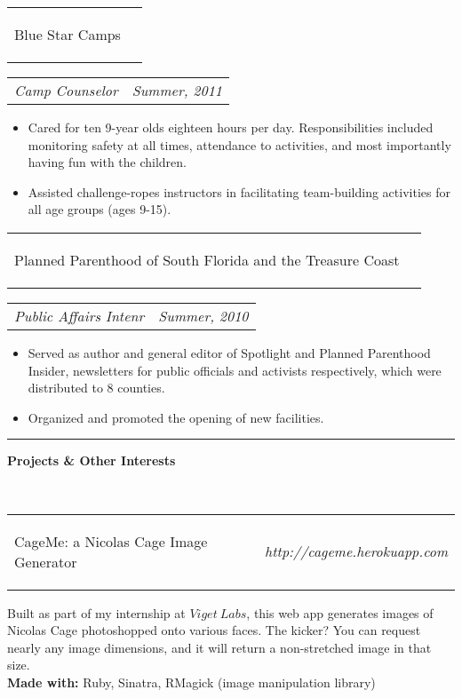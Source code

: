 \documentclass[11pt]{article}
\makeatletter
\newcommand{\headerrow}[2]
{\begin{tabular*}{\linewidth}{l@{\extracolsep{\fill}}r}
	#1 &
	#2 \\
\end{tabular*}}
\makeatother
\begin{document}
	\headerrow
		{\begin{Large}Blue Star Camps\end{Large}}
		{}
	\headerrow
		{\textit{Camp Counselor}}
		{\textit{Summer, 2011}}
	\begin{itemize}
		\item Cared for ten 9-year olds eighteen hours per day. Responsibilities included monitoring safety at all times,
attendance to activities, and most importantly having fun with the children.
		\vspace{-0.8em}
		\item Assisted challenge-ropes instructors in facilitating team-building activities for all age groups (ages 9-15).
	\end{itemize}
	
	\headerrow
		{\begin{Large}Planned Parenthood of South Florida and the Treasure Coast
\end{Large}}
		{}
	\headerrow
		{\textit{Public Affairs Intenr}}
		{\textit{Summer, 2010}}
	\begin{itemize}
		\item Served as author and general editor of Spotlight and Planned Parenthood Insider, newsletters for public
officials and activists respectively, which were distributed to 8 counties.
		\vspace{-0.8em}
		\item Organized and promoted the opening of new facilities.
	\end{itemize}
\hrule
\vspace{0.5em}

\begin{LARGE}
	\bf Projects \& Other Interests
\end{LARGE} 
\vspace{0.5em} \\
\headerrow
	{\begin{Large}CageMe: a Nicolas Cage Image Generator\end{Large}}
	{\textit{http://cageme.herokuapp.com}}
	\begin{normalsize}
	\hspace*{1.5em}Built as part of my internship at $Viget\ Labs$, this web app generates images of Nicolas Cage photoshopped onto various faces. The kicker? You can request nearly any image dimensions, and it will return a non-stretched image in that size. \\
	{\bf Made with:} Ruby, Sinatra, RMagick (image manipulation library)
	\end{normalsize} \\
\end{document}
